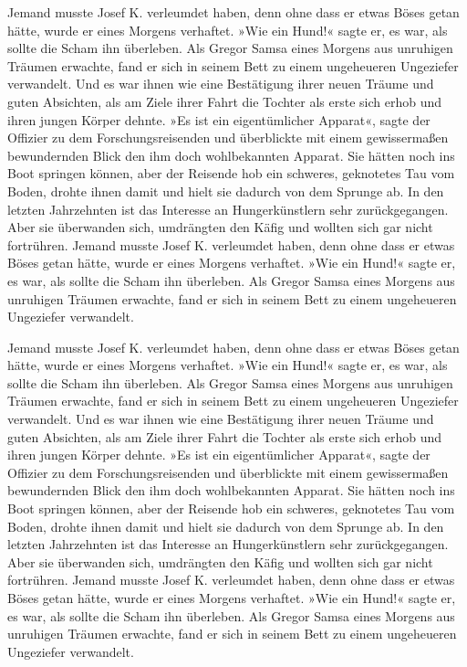 Jemand musste Josef K. verleumdet haben, denn ohne dass er etwas Böses
getan hätte, wurde er eines Morgens verhaftet. »Wie ein Hund!« sagte er,
es war, als sollte die Scham ihn überleben. Als Gregor Samsa eines
Morgens aus unruhigen Träumen erwachte, fand er sich in seinem Bett zu
einem ungeheueren Ungeziefer verwandelt. Und es war ihnen wie eine
Bestätigung ihrer neuen Träume und guten Absichten, als am Ziele ihrer
Fahrt die Tochter als erste sich erhob und ihren jungen Körper dehnte.
»Es ist ein eigentümlicher Apparat«, sagte der Offizier zu dem
Forschungsreisenden und überblickte mit einem gewissermaßen bewundernden
Blick den ihm doch wohlbekannten Apparat. Sie hätten noch ins Boot
springen können, aber der Reisende hob ein schweres, geknotetes Tau vom
Boden, drohte ihnen damit und hielt sie dadurch von dem Sprunge ab. In
den letzten Jahrzehnten ist das Interesse an Hungerkünstlern sehr
zurückgegangen. Aber sie überwanden sich, umdrängten den Käfig und
wollten sich gar nicht fortrühren. Jemand musste Josef K. verleumdet
haben, denn ohne dass er etwas Böses getan hätte, wurde er eines Morgens
verhaftet. »Wie ein Hund!« sagte er, es war, als sollte die Scham ihn
überleben. Als Gregor Samsa eines Morgens aus unruhigen Träumen
erwachte, fand er sich in seinem Bett zu einem ungeheueren Ungeziefer
verwandelt.


Jemand musste Josef K. verleumdet haben, denn ohne dass er etwas Böses
getan hätte, wurde er eines Morgens verhaftet. »Wie ein Hund!« sagte er,
es war, als sollte die Scham ihn überleben. Als Gregor Samsa eines
Morgens aus unruhigen Träumen erwachte, fand er sich in seinem Bett zu
einem ungeheueren Ungeziefer verwandelt. Und es war ihnen wie eine
Bestätigung ihrer neuen Träume und guten Absichten, als am Ziele ihrer
Fahrt die Tochter als erste sich erhob und ihren jungen Körper dehnte.
»Es ist ein eigentümlicher Apparat«, sagte der Offizier zu dem
Forschungsreisenden und überblickte mit einem gewissermaßen bewundernden
Blick den ihm doch wohlbekannten Apparat. Sie hätten noch ins Boot
springen können, aber der Reisende hob ein schweres, geknotetes Tau vom
Boden, drohte ihnen damit und hielt sie dadurch von dem Sprunge ab. In
den letzten Jahrzehnten ist das Interesse an Hungerkünstlern sehr
zurückgegangen. Aber sie überwanden sich, umdrängten den Käfig und
wollten sich gar nicht fortrühren. Jemand musste Josef K. verleumdet
haben, denn ohne dass er etwas Böses getan hätte, wurde er eines Morgens
verhaftet. »Wie ein Hund!« sagte er, es war, als sollte die Scham ihn
überleben. Als Gregor Samsa eines Morgens aus unruhigen Träumen
erwachte, fand er sich in seinem Bett zu einem ungeheueren Ungeziefer
verwandelt.


